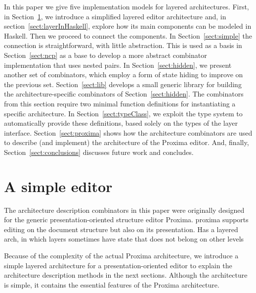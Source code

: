 \documentclass[preprint,natbib]{sigplanconf}
\begin{document}
In this paper we give five implementation models for layered architectures. First, in Section~\ref{sect:simpleEditor}, we introduce a simplified layered editor architecture and, in section~\ref{sect:layerInHaskell}, explore how its main components can be modeled in Haskell. Then we proceed to connect the components. In Section~\ref{sect:simple} the connection is straightforward, with little abstraction. This is used as a basis in Section~\ref{sect:ncp} as a base to develop a more abstract combinator implementation that uses nested pairs. In Section~\ref{sect:hidden}, we present another set of combinators, which employ a form of state hiding to improve on the previous set. Section~\ref{sect:lib} develops a small generic library for building the architecture-specific combinators of Section~\ref{sect:hidden}. The combinators from this section require two minimal function definitions for instantiating a specific architecture. In Section~\ref{sect:typeClass}, we exploit the type system to automatically provide these definitions, based solely on the types of the layer interface. Section~\ref{sect:proxima} shows how the architecture combinators are used to describe (and implement) the architecture of the Proxima editor. And, finally, Section~\ref{sect:conclusions} discusses future work and concludes.
			
			
			
\section{A simple editor}\label{sect:simpleEditor}

The architecture description combinators in this paper were originally designed for the generic presentation-oriented structure editor Proxima. proxima supports editing on the document structure but also on its presentation. Has a layered arch, in which layers sometimes have state that does not belong on other levels

Because of the complexity of the actual Proxima architecture, we introduce a simple layered architecture for a presentation-oriented editor to explain the architecture description methods in the next sections. Although the architecture is simple, it contains the essential features of the Proxima architecture. 
\end{document}
